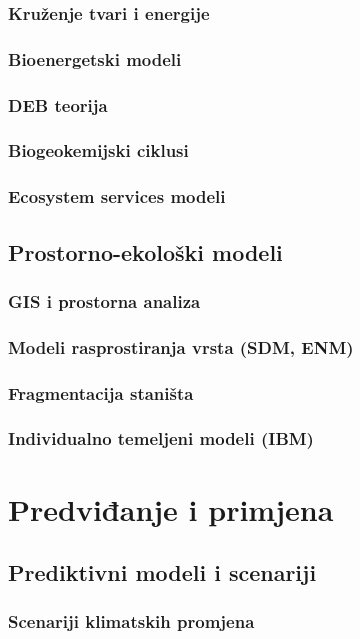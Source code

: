 \documentclass[12pt,a4paper]{book}
\begin{document}
	\section{Kruženje tvari i energije}
	\section{Bioenergetski modeli}
	\section{DEB teorija}
	\section{Biogeokemijski ciklusi}
	\section{Ecosystem services modeli}
	
	\chapter{Prostorno-ekološki modeli}
	\section{GIS i prostorna analiza}
	\section{Modeli rasprostiranja vrsta (SDM, ENM)}
	\section{Fragmentacija staništa}
	\section{Individualno temeljeni modeli (IBM)}
	
	\part{Predviđanje i primjena}
	\chapter{Prediktivni modeli i scenariji}
	\section{Scenariji klimatskih promjena}
\end{document}
